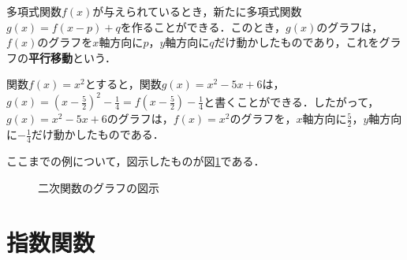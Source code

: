 \begin{definition}[グラフの平行移動]
	多項式関数$f(x)$が与えられているとき，新たに多項式関数$g(x) = f(x-p) + q$を作ることができる．このとき，$g(x)$のグラフは，$f(x)$のグラフを$x$軸方向に$p$，$y$軸方向に$q$だけ動かしたものであり，これをグラフの\textbf{平行移動}という．
\end{definition}
\begin{example*}
	関数$f(x) = x^2$とすると，関数$g(x) = x^2-5x+6$は，$g(x) = \left(x-\frac{5}{2}\right)^2-\frac{1}{4} = f\left(x-\frac{5}{2}\right)-\frac{1}{4}$と書くことができる．したがって，$g(x) = x^2-5x+6$のグラフは，$f(x) = x^2$のグラフを，$x$軸方向に$\frac{5}{2}$，$y$軸方向に$-\frac{1}{4}$だけ動かしたものである．
\end{example*}

ここまでの例について，図示したものが図\ref{fig:quadraticFunction}である．

\vfill
\begin{figure}[!h]
	\centering
	\caption{二次関数のグラフの図示}
	\label{fig:quadraticFunction}
\end{figure}
\clearpage

\section{指数関数}